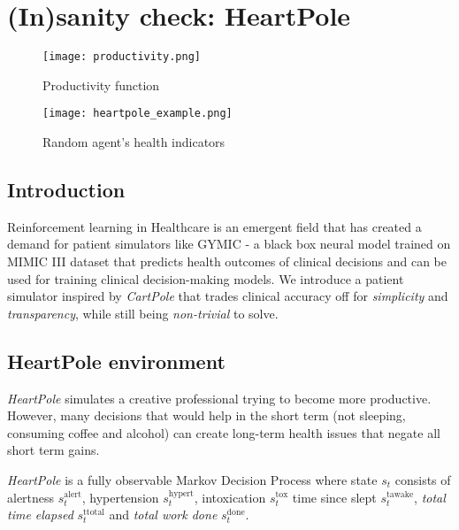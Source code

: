 \chapter{(In)sanity check: HeartPole}
\label{ch:heartpole}



\begin{figure}[H]
    \centering
    \texttt{[image: productivity.png]}
    \caption{Productivity function}
    \label{fig:productivity}
\end{figure}

\begin{figure}[H]
    \centering
    \texttt{[image: heartpole\_example.png]}
    \caption{Random agent's health indicators}
    \label{fig:random}
\end{figure}


\section{Introduction}
\label{sec:heartpole-introduction}

Reinforcement learning in Healthcare is an emergent field that has created a demand for patient simulators like GYMIC \cite{gymic} - a black box neural model trained on MIMIC III dataset \cite{mimic} that predicts health outcomes of clinical decisions and can be used for training clinical decision-making models. We introduce a patient simulator inspired by \emph{CartPole} \cite{cartpole} that trades clinical accuracy off for \emph{simplicity} and \emph{transparency}, while still being \emph{non-trivial} to solve.

\section{HeartPole environment}
\label{sec:heartpole-methodology}

\emph{HeartPole} simulates a creative professional trying to become more productive.
However, many decisions that would help in the short term (not sleeping, consuming coffee and alcohol) can create long-term health issues that negate all short term gains.

\emph{HeartPole} is a fully observable Markov Decision Process \cite{mdp} where state $s_t$ consists of alertness $s^\text{alert}_t$, hypertension $s^\text{hypert}_t$, intoxication $s^\text{tox}_t$ time since slept $s^\text{tawake}_t$, \emph{total time elapsed} $s^\text{ttotal}_t$ and \emph{total work done} $s^\text{done}_t$.

